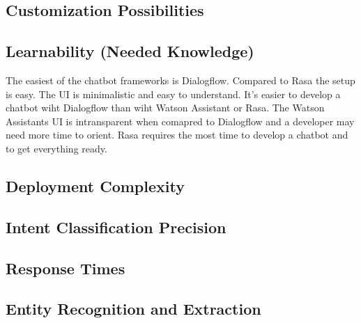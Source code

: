 \subsection*{Customization Possibilities}
\subsection*{Learnability (Needed Knowledge)}
The easiest of the chatbot frameworks is Dialogflow.
Compared to Rasa the setup is easy.
The UI is minimalistic and easy to understand.
It's easier to develop a chatbot wiht Dialogflow than wiht Watson Assistant or Rasa.
The Watson Assistants UI is intransparent when comapred to Dialogflow and a developer 
may need more time to orient.
Rasa requires the most time to develop a chatbot and to get everything ready.
\subsection*{Deployment Complexity}
\subsection*{Intent Classification Precision}
\subsection*{Response Times}
\subsection*{Entity Recognition and Extraction}

